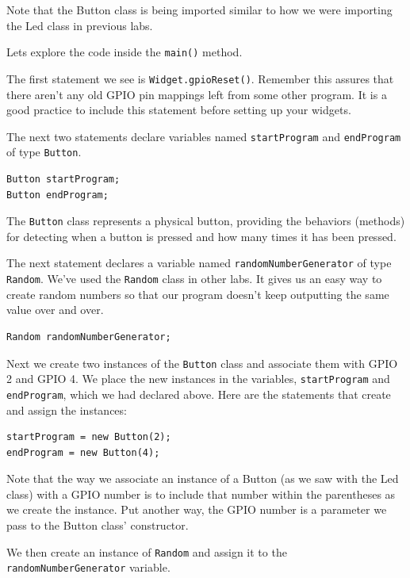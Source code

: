 Note that the Button class is being imported similar to how we were importing the Led class in previous labs.

Lets explore the code inside the \texttt{main()} method.

The first statement we see is \texttt{Widget.gpioReset()}. Remember this assures that there aren't any old GPIO pin mappings left from some other program. It is a good practice to include this statement before setting up your widgets.

The next two statements declare variables named \texttt{startProgram} and \texttt{endProgram} of type \texttt{Button}. 

\beforeverb
\begin{verbatim}
Button startProgram;
Button endProgram;
\end{verbatim}
\afterverb

The \texttt{Button} class represents a physical button, providing the behaviors (methods) for detecting when a button is pressed and how many times it has been pressed.

The next statement declares a variable named \texttt{randomNumberGenerator} of type \texttt{Random}. We've used the \texttt{Random} class in other labs. It gives us an easy way to create random numbers so that our program doesn't keep outputting the same value over and over. 

\beforeverb
\begin{verbatim}
Random randomNumberGenerator;
\end{verbatim}
\afterverb

Next we create two instances of the \texttt{Button} class and associate them with GPIO 2 and GPIO 4. We place the new instances in the variables, \texttt{startProgram} and \texttt{endProgram}, which we had declared above. Here are the statements that create and assign the instances:

\beforeverb
\begin{verbatim}
startProgram = new Button(2);
endProgram = new Button(4);
\end{verbatim}
\afterverb

Note that the way we associate an instance of a Button (as we saw with the Led class) with a GPIO number is to include that number within the parentheses as we create the instance. Put another way, the GPIO number is a parameter we pass to the Button class' constructor.

We then create an instance of \texttt{Random} and assign it to the \texttt{randomNumberGenerator} variable.

